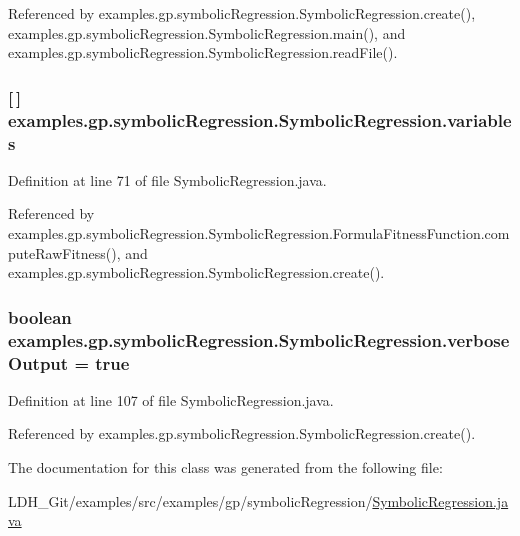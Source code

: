 Referenced by examples.\-gp.\-symbolic\-Regression.\-Symbolic\-Regression.\-create(), examples.\-gp.\-symbolic\-Regression.\-Symbolic\-Regression.\-main(), and examples.\-gp.\-symbolic\-Regression.\-Symbolic\-Regression.\-read\-File().

\hypertarget{classexamples_1_1gp_1_1symbolic_regression_1_1_symbolic_regression_abaa9073c106411b861ea296c98bd3009}{
\subsubsection[{variables}]{ \mbox{[}$\,$\mbox{]} examples.\-gp.\-symbolic\-Regression.\-Symbolic\-Regression.\-variables\hspace{0.3cm}{\ttfamily [static]}}}\label{classexamples_1_1gp_1_1symbolic_regression_1_1_symbolic_regression_abaa9073c106411b861ea296c98bd3009}


Definition at line 71 of file Symbolic\-Regression.\-java.



Referenced by examples.\-gp.\-symbolic\-Regression.\-Symbolic\-Regression.\-Formula\-Fitness\-Function.\-compute\-Raw\-Fitness(), and examples.\-gp.\-symbolic\-Regression.\-Symbolic\-Regression.\-create().

\hypertarget{classexamples_1_1gp_1_1symbolic_regression_1_1_symbolic_regression_a4c0556abaae9f920b5eb23f0963697e7}{
\subsubsection[{verbose\-Output}]{\setlength{\rightskip}{0pt plus 5cm}boolean examples.\-gp.\-symbolic\-Regression.\-Symbolic\-Regression.\-verbose\-Output = true\hspace{0.3cm}{\ttfamily [static]}}}\label{classexamples_1_1gp_1_1symbolic_regression_1_1_symbolic_regression_a4c0556abaae9f920b5eb23f0963697e7}


Definition at line 107 of file Symbolic\-Regression.\-java.



Referenced by examples.\-gp.\-symbolic\-Regression.\-Symbolic\-Regression.\-create().



The documentation for this class was generated from the following file\-:\begin{DoxyCompactItemize}
\item 
L\-D\-H\-\_\-\-Git/examples/src/examples/gp/symbolic\-Regression/\hyperlink{_symbolic_regression_8java}{Symbolic\-Regression.\-java}\end{DoxyCompactItemize}
